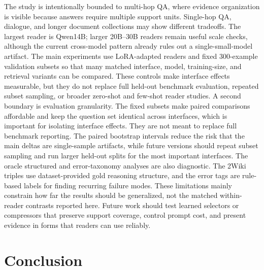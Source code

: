 \documentclass[a4paper,fleqn]{cas-sc}
\begin{document}
The study is intentionally bounded to multi-hop QA, where evidence organization
is visible because answers require multiple support units. Single-hop QA,
dialogue, and longer document collections may show different tradeoffs. The
largest reader is Qwen14B; larger 20B--30B readers remain useful scale checks,
although the current cross-model pattern already rules out a single-small-model
artifact. The main experiments use LoRA-adapted readers and fixed 300-example validation
subsets so that many matched interface, model, training-size, and retrieval
variants can be compared. These controls make interface effects measurable,
but they do not replace full held-out benchmark evaluation, repeated subset
sampling, or broader zero-shot and few-shot reader studies. A second boundary is evaluation granularity. The fixed subsets make paired
comparisons affordable and keep the question set identical across interfaces,
which is important for isolating interface effects. They are not meant to
replace full benchmark reporting. The paired bootstrap intervals reduce the
risk that the main deltas are single-sample artifacts, while future versions
should repeat subset sampling and run larger held-out splits for the most
important interfaces. The oracle structured and error-taxonomy analyses are also diagnostic. The
2Wiki triples use dataset-provided gold reasoning structure, and the error tags
are rule-based labels for finding recurring failure modes. These limitations
mainly constrain how far the results should be generalized, not the matched
within-reader contrasts reported here. Future work should test learned selectors
or compressors that preserve support coverage, control prompt cost, and present
evidence in forms that readers can use reliably.

\section{Conclusion}
\end{document}
